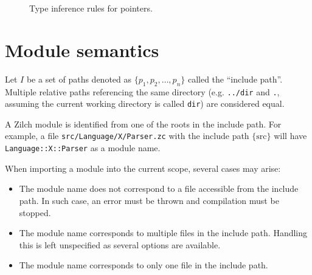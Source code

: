 \begin{figure}[H]

	\caption{Type inference rules for pointers.}
	\label{fig:zilch-staticsem-exprs-atoms-ptr-typerules}
\end{figure}

\section{Module semantics}\label{sec:zilch-staticsem-modules}

Let $I$ be a set of paths denoted as $\{ p_1, p_2, \ldots, p_n \}$ called the ``include path''.
Multiple relative paths referencing the same directory (e.g. \verb|../dir| and \verb|.|, assuming the current working directory is called \verb|dir|) are considered equal.

A Zilch module is identified from one of the roots in the include path.
For example, a file \verb|src/Language/X/Parser.zc| with the include path $\{ \text{src} \}$ will have \verb|Language::X::Parser| as a module name.

When importing a module into the current scope, several cases may arise:
\begin{itemize}
	\item The module name does not correspond to a file accessible from the include path.
	      In such case, an error must be thrown and compilation must be stopped.
	\item The module name corresponds to multiple files in the include path.
	      Handling this is left unspecified as several options are available.
	\item The module name corresponds to only one file in the include path.
\end{itemize}

